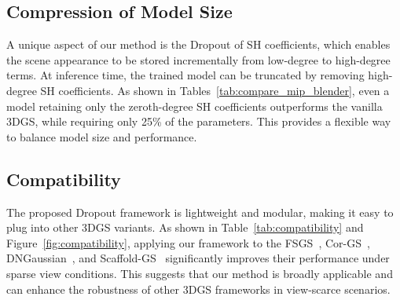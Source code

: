 \subsection{Compression of Model Size} 
A unique aspect of our method is the Dropout of SH coefficients, which enables the scene appearance to be stored incrementally from low-degree to high-degree terms. 
At inference time, the trained model can be truncated by removing high-degree SH coefficients. As shown in Tables~\ref{tab:compare_mip_blender}, even a model retaining only the zeroth-degree SH coefficients outperforms the vanilla 3DGS, while requiring only 25\% of the parameters. This provides a flexible way to balance model size and performance.


\begin{table}[t]
  \centering
  \caption{\textbf{Compatibility to 3DGS variants on the LLFF dataset (3 views)}. The proposed \methodname{} can be easily integrated into various 3DGS-based methods and improve their performance.}
  \resizebox{0.8\linewidth}{!}{
    
    }
\label{tab:compatibility}
\end{table}



\subsection{Compatibility} 
The proposed Dropout framework is lightweight and modular, making it easy to plug into other 3DGS variants. As shown in Table~\ref{tab:compatibility} and Figure~\ref{fig:compatibility}, applying our framework to the FSGS~\cite{zhu2024fsgs}, Cor-GS~\cite{zhang2024corgs}, DNGaussian~\cite{li2024dngaussian}, and Scaffold-GS~\cite{lu2024scaffold} significantly improves their performance under sparse view conditions. This suggests that our method is broadly applicable and can enhance the robustness of other 3DGS frameworks in view-scarce scenarios.


